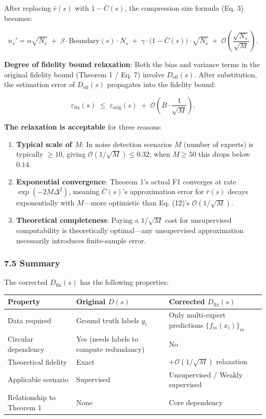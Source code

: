 \documentclass[
  12pt,
]{article}
\providecommand{\tightlist}{%
  \setlength{\itemsep}{0pt}\setlength{\parskip}{0pt}}
\begin{document}
After replacing \(\bar{r}(s)\) with \(1 - \bar{C}(s)\), the compression size formula (Eq. 3) becomes:

\[
n_s' = \alpha \sqrt{N_s} \;+\; \beta \cdot \text{Boundary}(s) \cdot N_s \;+\; \gamma \cdot \bigl(1 - \bar{C}(s)\bigr) \cdot \sqrt{N_s} \;+\; \mathcal{O}\!\left(\frac{\sqrt{N_s}}{\sqrt{M}}\right).
\tag{14}
\]

\textbf{Degree of fidelity bound relaxation}: Both the bias and variance terms in the original fidelity bound (Theorem 1 / Eq. 7) involve \(D_{\text{eff}}(s)\). After substitution, the estimation error of \(D_{\text{eff}}(s)\) propagates into the fidelity bound:

\[
\varepsilon_{\text{fix}}(s) \;\leq\; \varepsilon_{\text{orig}}(s) \;+\; \mathcal{O}\!\left(B \cdot \frac{1}{\sqrt{M}}\right).
\tag{15}
\]

\textbf{The relaxation is acceptable} for three reasons:

\begin{enumerate}
\def\labelenumi{\arabic{enumi}.}
\tightlist
\item
  \textbf{Typical scale of \(M\)}: In noise detection scenarios \(M\) (number of experts) is typically \(\geq 10\), giving \(\mathcal{O}(1/\sqrt{M}) \leq 0.32\); when \(M \geq 50\) this drops below \(0.14\).
\item
  \textbf{Exponential convergence}: Theorem 1's actual F1 converges at rate \(\exp(-2M\Delta^2)\), meaning \(\bar{C}(s)\)'s approximation error for \(\bar{r}(s)\) decays exponentially with \(M\)---more optimistic than Eq. (12)'s \(\mathcal{O}(1/\sqrt{M})\).
\item
  \textbf{Theoretical completeness}: Paying a \(1/\sqrt{M}\) cost for unsupervised computability is theoretically optimal---any unsupervised approximation necessarily introduces finite-sample error.
\end{enumerate}

\subsubsection{7.5 Summary}\label{summary-fix}

The corrected \(D_{\text{fix}}(s)\) has the following properties:

\begin{longtable}[]{@{}lll@{}}
\toprule\noalign{}
Property & Original \(D(s)\) & Corrected \(D_{\text{fix}}(s)\) \\
\midrule\noalign{}
\endhead
\bottomrule\noalign{}
\endlastfoot
Data required & Ground truth labels \(y_i\) & Only multi-expert predictions \(\{f_m(x_i)\}_m\) \\
Circular dependency & Yes (needs labels to compute redundancy) & No \\
Theoretical fidelity & Exact & \(+ \mathcal{O}(1/\sqrt{M})\) relaxation \\
Applicable scenario & Supervised & Unsupervised / Weakly supervised \\
Relationship to Theorem 1 & None & Core dependency \\
\end{longtable}
\end{document}
